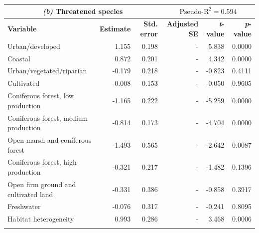 \documentclass{article}
\begin{document}
\begin{table}[h]
\begin{tabular}{l r r r r r}
    \multicolumn{3}{c}{\textbf{\textit{(b)}  Threatened species}} & \multicolumn{3}{c}{$\text{Pseudo-R}^2 = 0.594$} \\
    \hline
    \textbf{Variable} & \textbf{Estimate} & \textbf{Std. error} & \textbf{Adjusted SE} & \textbf{\textit{t}-value} & \textbf{\textit{p}-value} \\
    \hline
    Urban/developed                         & 1.155    & 0.198     & -       & 5.838    & 0.0000    \\
    Coastal                                 & 0.872    & 0.201     & -       & 4.342    & 0.0000    \\
    Urban/vegetated/riparian                & -0.179   & 0.218     & -       & -0.823   & 0.4111    \\
    Cultivated                              & -0.008   & 0.153     & -       & -0.050   & 0.9605    \\
    Coniferous forest, low production       & -1.165   & 0.222     & -       & -5.259   & 0.0000    \\
    Coniferous forest, medium production    & -0.814   & 0.173     & -       & -4.704   & 0.0000    \\
    Open marsh and coniferous forest        & -1.493   & 0.565     & -       & -2.642   & 0.0087    \\
    Coniferous forest, high production      & -0.321   & 0.217     & -       & -1.482   & 0.1396    \\
    Open firm ground and cultivated land    & -0.331   & 0.386     & -       & -0.858   & 0.3917    \\
    Freshwater                              & -0.076   & 0.317     & -       & -0.241   & 0.8095    \\
    Habitat heterogeneity                   & 0.993    & 0.286     & -       & 3.468    & 0.0006    \\
    \hline
    & & & & & \\
    

\end{tabular}
\end{table}
\end{document}
